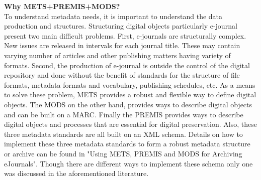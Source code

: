 \begin{enumerate}
	{\bf Why METS+PREMIS+MODS? }\\
	To understand metadata needs, it is important to understand the data production and structures. Structuring digital objects particularly e-journal present two main difficult problems. First, e-journals are structurally complex. New issues are released in intervals for each journal title. These may contain varying number of articles and other publishing matters having variety of formats. Second, the production of e-journal is outside the control of the digital repository and done without the benefit of standards for the structure of file formats, metadata formats and vocabulary, publishing schedules, etc.\cite{Dappert2008}
	As a means to solve these problem, METS provides a robust and flexible way to define digital objects. The MODS on the other hand, provides ways to describe digital objects and can be built on a MARC. Finally the PREMIS provides ways to describe digital objects and processes that are essential for digital preservation. Also, these three metadata standards are all built on an XML schema.\cite{Dappert2008}
	Details on how to implement these three metadata standards to form a robust metadata structure or archive can be found in "Using METS, PREMIS and MODS for Archiving eJournals".\cite{Dappert2008} Though there are different ways to implement these schema only one was discussed in the aforementioned literature.
	

\end{enumerate}

